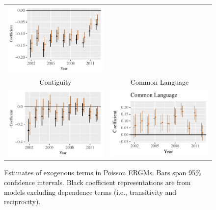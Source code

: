 \documentclass{article}
\begin{document}
\begin{figure}[htp]
\begin{tabular}{c@{\hskip -.4cm}c}
\includegraphics[height=.22\textheight, clip=true, trim=.5cm .5cm 0cm .1cm]{draft_figures/rl_plots/Distance.pdf}   \\
Contiguity &
Common Language\\
\includegraphics[height=.22\textheight, clip=true, trim=0cm .5cm 0cm .1cm]{draft_figures/rl_plots/Contiguity.pdf}  &
\includegraphics[height=.22\textheight, clip=true, trim=.5cm .5cm 0cm .1cm]{draft_figures/rl_plots/CommonLanguage.pdf}   \\
\end{tabular}
\caption{\label{fig:effectPlots1} Estimates of exogenous terms in Poisson ERGMs. Bars span 95\% confidence intervals. Black coefficient representations are from models excluding dependence terms (i.e., transitivity and reciprocity).}
\end{figure}
\end{document}
